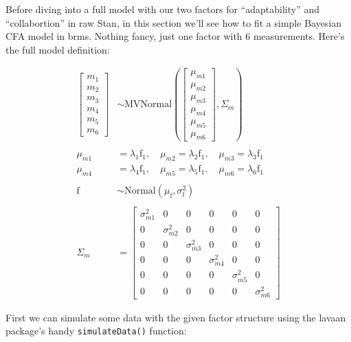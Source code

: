 \documentclass[
  letterpaper,
  DIV=11,
  numbers=noendperiod]{scrreprt}
\begin{document}
Before diving into a full model with our two factors for
``adaptability'' and ``collabortion'' in raw Stan, in this section we'll
see how to fit a simple Bayesian CFA model in brms. Nothing fancy, just
one factor with 6 measurements. Here's the full model definition:

\[
\begin{aligned}
\begin{bmatrix}
m_{1} \\
m_{2} \\
m_{3} \\
m_{4} \\
m_{5} \\
m_{6}
\end{bmatrix}
&\sim \text{MVNormal}
\left(
\begin{bmatrix}
\mu_{m1} \\
\mu_{m2} \\
\mu_{m3} \\
\mu_{m4} \\
\mu_{m5} \\
\mu_{m6}
\end{bmatrix},
\Sigma_m
\right) \\
\\
\mu_{m1} &= \lambda_1 \text{f}_1, \quad \mu_{m2} = \lambda_2 \text{f}_1, \quad \mu_{m3} = \lambda_3 \text{f}_1 \\
\mu_{m4} &= \lambda_4 \text{f}_1, \quad \mu_{m5} = \lambda_5 \text{f}_1, \quad \mu_{m6} = \lambda_6 \text{f}_1 \\
\\
\text{f} &\sim \text{Normal}(\mu_\text{f}, \sigma_\text{f}^2) \\
\\
\Sigma_m &=
\begin{bmatrix}
\sigma_{m1}^2 & 0 & 0 & 0 & 0 & 0 \\
0 & \sigma_{m2}^2 & 0 & 0 & 0 & 0 \\
0 & 0 & \sigma_{m3}^2 & 0 & 0 & 0 \\
0 & 0 & 0 & \sigma_{m4}^2 & 0 & 0 \\
0 & 0 & 0 & 0 & \sigma_{m5}^2 & 0 \\
0 & 0 & 0 & 0 & 0 & \sigma_{m6}^2
\end{bmatrix}
\end{aligned}
\]

First we can simulate some data with the given factor structure using
the lavaan package's handy \texttt{simulateData()} function:
\end{document}
